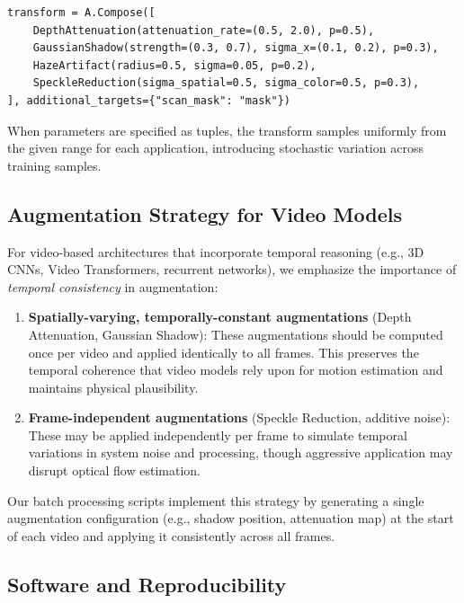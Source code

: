 \documentclass{article}
\theoremstyle{plain}
\theoremstyle{definition}
\theoremstyle{remark}
\begin{document}
\begin{verbatim}
transform = A.Compose([
    DepthAttenuation(attenuation_rate=(0.5, 2.0), p=0.5),
    GaussianShadow(strength=(0.3, 0.7), sigma_x=(0.1, 0.2), p=0.3),
    HazeArtifact(radius=0.5, sigma=0.05, p=0.2),
    SpeckleReduction(sigma_spatial=0.5, sigma_color=0.5, p=0.3),
], additional_targets={"scan_mask": "mask"})
\end{verbatim}

When parameters are specified as tuples, the transform samples uniformly from the given range for each application, introducing stochastic variation across training samples.

\subsection{Augmentation Strategy for Video Models}

For video-based architectures that incorporate temporal reasoning (e.g., 3D CNNs, Video Transformers, recurrent networks), we emphasize the importance of \textit{temporal consistency} in augmentation:

\begin{enumerate}
    \item \textbf{Spatially-varying, temporally-constant augmentations} (Depth Attenuation, Gaussian Shadow): These augmentations should be computed once per video and applied identically to all frames. This preserves the temporal coherence that video models rely upon for motion estimation and maintains physical plausibility.
    
    \item \textbf{Frame-independent augmentations} (Speckle Reduction, additive noise): These may be applied independently per frame to simulate temporal variations in system noise and processing, though aggressive application may disrupt optical flow estimation.
\end{enumerate}

Our batch processing scripts implement this strategy by generating a single augmentation configuration (e.g., shadow position, attenuation map) at the start of each video and applying it consistently across all frames.

\subsection{Software and Reproducibility}
\label{appendix:software}
\end{document}
